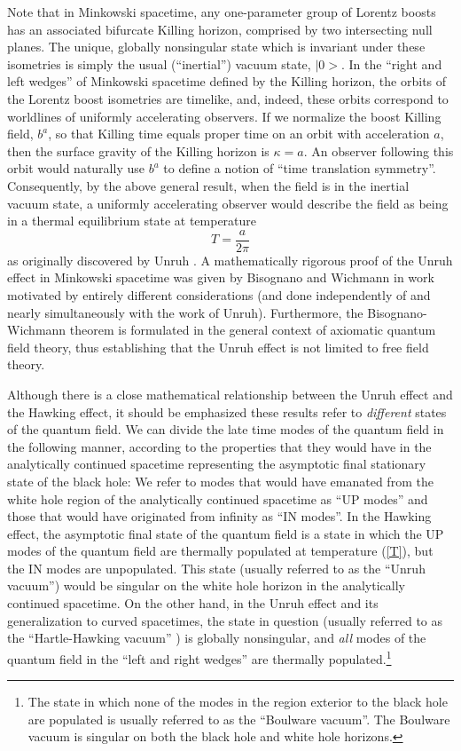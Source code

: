Note that in Minkowski spacetime, any one-parameter group of Lorentz
boosts has an associated bifurcate Killing horizon, comprised by two
intersecting null planes. The unique, globally nonsingular state which
is invariant under these isometries is simply the usual (``inertial'')
vacuum state, $|0>$.  In the ``right and left wedges'' of Minkowski
spacetime defined by the Killing horizon, the orbits of the Lorentz
boost isometries are timelike, and, indeed, these orbits correspond to
worldlines of uniformly accelerating observers. If we normalize the
boost Killing field, $b^a$, so that Killing time equals proper time on
an orbit with acceleration $a$, then the surface gravity of the
Killing horizon is $\kappa = a$. An observer following this orbit
would naturally use $b^a$ to define a notion of ``time translation
symmetry''. Consequently, by the above general result, when the field
is in the inertial vacuum state, a uniformly accelerating observer
would describe the field as being in a thermal equilibrium state at
temperature
\begin{equation}
T = \frac{a}{2 \pi} 
\label{Tu}
\end{equation}
as originally discovered by Unruh \cite{u1}. A mathematically rigorous
proof of the Unruh effect in Minkowski spacetime was given by
Bisognano and Wichmann \cite{bw} in work motivated by entirely
different considerations (and done independently of and nearly
simultaneously with the work of Unruh). Furthermore, the
Bisognano-Wichmann theorem is formulated in the general context of
axiomatic quantum field theory, thus establishing that the Unruh
effect is not limited to free field theory.

Although there is a close mathematical relationship between the Unruh
effect and the Hawking effect, it should be emphasized these results
refer to {\em different} states of the quantum field. We can divide
the late time modes of the quantum field in the following manner,
according to the properties that they would have in the analytically
continued spacetime \cite{rw2} representing the asymptotic final
stationary state of the black hole: We refer to modes that would have
emanated from the white hole region of the analytically continued
spacetime as ``UP modes'' and those that would have originated from
infinity as ``IN modes''.  In the Hawking effect, the asymptotic final
state of the quantum field is a state in which the UP modes of the
quantum field are thermally populated at temperature (\ref{T}), but
the IN modes are unpopulated. This state (usually referred to as the
``Unruh vacuum'') would be singular on the white hole horizon in the
analytically continued spacetime. On the other hand, in the Unruh
effect and its generalization to curved spacetimes, the state in
question (usually referred to as the ``Hartle-Hawking vacuum''
\cite{hh}) is globally nonsingular, and {\em all} modes of the quantum
field in the ``left and right wedges'' are thermally
populated.\footnote{The state in which none of the modes in the region
exterior to the black hole are populated is usually referred to as the
``Boulware vacuum''. The Boulware vacuum is singular on both the black
hole and white hole horizons.}

